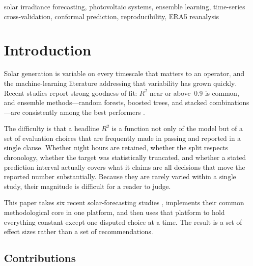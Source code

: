 \documentclass[conference]{IEEEtran}
\begin{document}
\begin{IEEEkeywords}
solar irradiance forecasting, photovoltaic systems, ensemble learning,
time-series cross-validation, conformal prediction, reproducibility,
ERA5 reanalysis
\end{IEEEkeywords}

\section{Introduction}

Solar generation is variable on every timescale that matters to an
operator, and the machine-learning literature addressing that
variability has grown quickly. Recent studies report strong
goodness-of-fit: $R^{2}$ near or above~0.9 is common, and ensemble
methods---random forests, boosted trees, and stacked
combinations---are consistently among the best performers
\cite{P2,P4,P5}.

The difficulty is that a headline $R^{2}$ is a function not only of the
model but of a set of evaluation choices that are frequently made in
passing and reported in a single clause. Whether night hours are
retained, whether the split respects chronology, whether the target was
statistically truncated, and whether a stated prediction interval
actually covers what it claims are all decisions that move the reported
number substantially. Because they are rarely varied within a single
study, their magnitude is difficult for a reader to judge.

This paper takes six recent solar-forecasting studies
\cite{P1,P2,P3,P4,P5,P6}, implements their common methodological core
in one platform, and then uses that platform to hold everything
constant except one disputed choice at a time. The result is a set of
effect sizes rather than a set of recommendations.

\subsection{Contributions}
\end{document}
